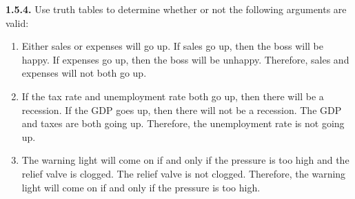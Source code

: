\documentclass[12pt]{amsart}
\newenvironment{statement}[1]{\smallskip\noindent\color[rgb]{.6627, .3529, .6314} {\bf #1.}}{}
\theoremstyle{definition}
\theoremstyle{remark}
\begin{document}
\begin{statement}{1.5.4}
Use truth tables to determine whether or not the following arguments are valid:
\begin{enumerate}
	\item Either sales or expenses will go up.
	If sales go up, then the boss will be happy.
	If expenses go up, then the boss will be unhappy.
	Therefore, sales and expenses will not both go up.
	
	\item If the tax rate and unemployment rate both go up, then there will be a recession.
	If the GDP goes up, then there will not be a recession.
	The GDP and taxes are both going up.
	Therefore, the unemployment rate is not going up.
	
	\item The warning light will come on if and only if the pressure is too high and the relief valve is clogged.
	The relief valve is not clogged.
	Therefore, the warning light will come on if and only if the pressure is too high.
\end{enumerate}
\end{statement}
\end{document}
